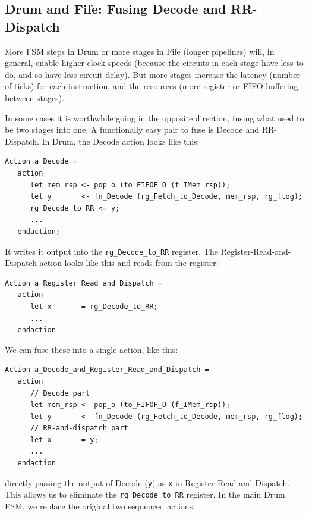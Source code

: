 
\subsection{Drum and Fife: Fusing Decode and RR-Dispatch}

\label{Sec_Fuse_Decode_RR}

More FSM steps in Drum or more stages in Fife (longer pipelines) will,
in general, enable higher clock speeds (because the circuits in each
stage have less to do, and so have less circuit delay).  But more
stages increase the latency (number of ticks) for each instruction,
and the resources (more register or FIFO buffering between stages).

In some cases it is worthwhile going in the opposite direction, fusing
what used to be two stages into one.  A functionally easy pair to fuse
is Decode and RR-Dispatch.  In Drum, the Decode action looks like
this:

{\footnotesize
\begin{Verbatim}[frame=single, label=src\_Drum/CPU.bsv]
   Action a_Decode =
   action
      let mem_rsp <- pop_o (to_FIFOF_O (f_IMem_rsp));
      let y       <- fn_Decode (rg_Fetch_to_Decode, mem_rsp, rg_flog);
      rg_Decode_to_RR <= y;
      ...
   endaction;
\end{Verbatim}
}

It writes it output into the \verb|rg_Decode_to_RR| register.  The
Register-Read-and-Dispatch action looks like this and reads from the
register:

{\footnotesize
\begin{Verbatim}[frame=single, label=src\_Drum/CPU.bsv]
   Action a_Register_Read_and_Dispatch =
   action
      let x       = rg_Decode_to_RR;
      ...
   endaction
\end{Verbatim}
}

We can fuse these into a single action, like this:

{\footnotesize
\begin{Verbatim}[frame=single]
   Action a_Decode_and_Register_Read_and_Dispatch =
   action
      // Decode part
      let mem_rsp <- pop_o (to_FIFOF_O (f_IMem_rsp));
      let y       <- fn_Decode (rg_Fetch_to_Decode, mem_rsp, rg_flog);
      // RR-and-dispatch part
      let x       = y;
      ...
   endaction
\end{Verbatim}
}

directly passing the output of Decode (\verb|y|) as \verb|x| in
Register-Read-and-Dispatch.  This allows us to eliminate the
\verb|rg_Decode_to_RR| register.  In the main Drum FSM, we replace the
original two sequenced actions:

